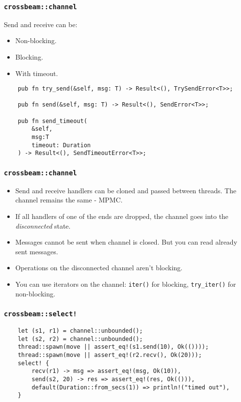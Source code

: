 \documentclass[aspectratio=1610,t]{beamer}
\begin{document}

\begin{frame}[fragile]
\frametitle{\texttt{crossbeam::channel}}
Send and receive can be:

\begin{itemize}
    \item Non-blocking.
    \item Blocking.
    \item With timeout.
\end{itemize}

\begin{verbatim}
    pub fn try_send(&self, msg: T) -> Result<(), TrySendError<T>>;

    pub fn send(&self, msg: T) -> Result<(), SendError<T>>;

    pub fn send_timeout(
        &self,
        msg:T
        timeout: Duration
    ) -> Result<(), SendTimeoutError<T>>;
\end{verbatim}
\end{frame}


\begin{frame}[fragile]
\frametitle{\texttt{crossbeam::channel}}
\begin{itemize}
    \item<1-> Send and receive handlers can be cloned and passed between threads. The channel remains the same - MPMC.
    \item<2-> If all handlers of one of the ends are dropped, the channel goes into the \textit{disconnected} state.
    \item<3-> Messages cannot be sent when channel is closed. But you can read already sent messages.
    \item<4-> Operations on the disconnected channel aren't blocking.
    \item<5-> You can use iterators on the channel: \texttt{iter()} for blocking, \texttt{try\_iter()} for non-blocking.
\end{itemize}
\end{frame}


\begin{frame}[fragile]
\frametitle{\texttt{crossbeam::select!}}
\begin{verbatim}
    let (s1, r1) = channel::unbounded();
    let (s2, r2) = channel::unbounded();
    thread::spawn(move || assert_eq!(s1.send(10), Ok(())));
    thread::spawn(move || assert_eq!(r2.recv(), Ok(20)));
    select! {
        recv(r1) -> msg => assert_eq!(msg, Ok(10)),
        send(s2, 20) -> res => assert_eq!(res, Ok(())),
        default(Duration::from_secs(1)) => println!("timed out"),
    }
\end{verbatim}
\end{frame}
\end{document}
